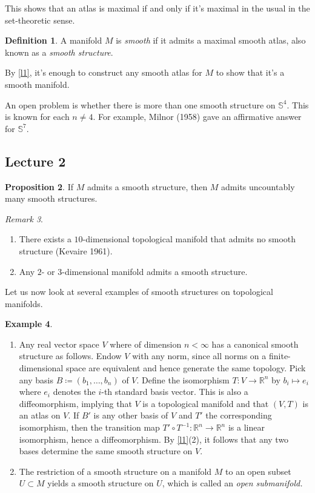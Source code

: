 \documentclass[10pt,letterpaper,cm]{nupset}
\theoremstyle{definition}
\newtheorem{definition}{Definition}[subsection]
\newtheorem{exmp}[definition]{Example}
\theoremstyle{theorem}
\newtheorem{prop}[definition]{Proposition}
\theoremstyle{remark}
\newtheorem{remark}[definition]{Remark}
\newcommand{\R}{\mathbb R}
\renewcommand{\S}{\mathbb S}
\newcommand{\1}{\mathbf{1}}
\newcommand{\0}{\vec 0}
\begin{document}
This shows that an atlas is maximal  if and only if it's maximal in the usual in the set-theoretic sense.

\theoremstyle{definition}
\begin{definition}{A manifold $M$ is \textit{smooth} if it admits a maximal smooth atlas, also known as a \textit{smooth structure}.}
\end{definition}

By \cref{l1}, it's enough to construct any smooth atlas for $M$ to show that it's a smooth manifold.

\medskip

An open problem is whether there is more than one smooth structure on $\S^4$. This is known for each $n \ne 4$. For example, Milnor (1958) gave an affirmative answer for $\S^7$.

\subsection{Lecture 2}


\begin{prop}
{If $M$ admits a smooth structure, then $M$ admits uncountably many smooth structures.} 
\end{prop}


\begin{remark} $ $
\begin{enumerate}
\item There exists a $10$-dimensional topological manifold that admits no smooth structure (Kevaire 1961).
\item Any $2$- or $3$-dimensional manifold admits a smooth structure.
\end{enumerate}
\end{remark}

\smallskip

Let us now look at several examples of smooth structures on topological manifolds.

\begin{exmp}\label{E1} $ $
\begin{enumerate}[label=(\arabic*)]
\item Any real vector space $V$ where of dimension  $n<\infty$ has a canonical smooth structure as follows. Endow $V$ with any norm, since all norms on a finite-dimensional space are equivalent and hence generate the same topology. Pick any basis $B\coloneqq  (b_1, \ldots, b_n)$ of $V$.  Define the isomorphism  $T: V \to \R^n$ by $b_i \mapsto e_i$ where $e_i$ denotes the $i$-th standard basis vector. This is also a diffeomorphism, implying that $V$ is a topological manifold and that $(V, T)$ is an atlas on $V$. If $B'$ is any other basis of $V$ and $T'$ the corresponding isomorphism, then the transition map $T' \circ T^{-1}: \R^n \to \R^n$ is a linear isomorphism, hence a diffeomorphism. By \cref{l1}(2), it follows that any two bases determine the same smooth structure on $V$. 
\item The restriction of a smooth structure on  a manifold $M$ to an open subset $U \subset M$ yields a smooth structure on $U$, which is called an \textit{open submanifold.} 
\end{enumerate}
\end{exmp}
\end{document}
